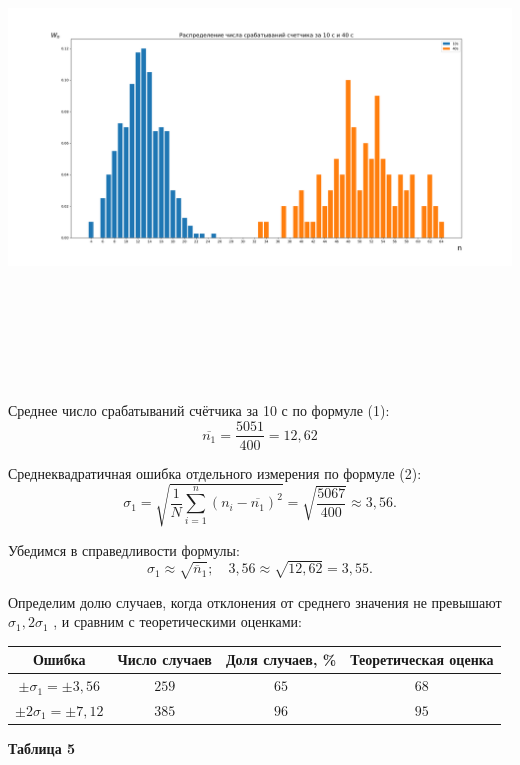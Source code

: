 \begin{center}
    \includegraphics[width=22cm, height=13cm, angle=90]{dist_10_40.png}
\end{center}



Среднее число срабатываний счётчика за 10 с по формуле (1):
\[\overline{n_1} = \frac{5051}{400} = 12,62\]


Среднеквадратичная ошибка отдельного измерения по формуле (2):
\[\sigma_1 = \sqrt{\frac{1}{N}\sum\limits_{i=1}^n (n_i-\overline{n_1})^2} = \sqrt{\frac{5067}{400}} \approx 3,56.\]

Убедимся в справедливости формулы:
\[\sigma_1 \approx \sqrt{\overline{n}_1};\quad 3,56 \approx \sqrt{12,62} = 3,55.\]


Определим долю случаев, когда отклонения от среднего значения не превышают $\sigma_1, 2\sigma_1$
, и сравним с теоретическими оценками:

\begin{center}
    \begin{tabular}{|c|c|c|c|}
        \hline
        Ошибка                   & Число случаев & Доля случаев, \% & Теоретическая оценка \\
        \hline
        $\pm\sigma_1 = \pm3,56$  & $259$         & $65$             & $68$                 \\
        \hline
        $\pm2\sigma_1 = \pm7,12$ & $385$         & $96$             & $95$                 \\
        \hline
    \end{tabular}
\end{center}
\begin{flushright}
    {\scriptsize \textbf{Таблица 5} }
\end{flushright}


